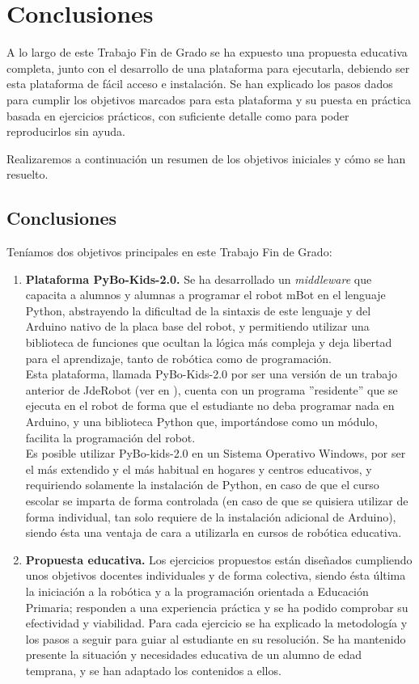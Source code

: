 \chapter{Conclusiones}\label{cap:conclusiones}
A lo largo de este Trabajo Fin de Grado se ha expuesto una propuesta educativa completa, junto con el desarrollo de una plataforma para ejecutarla, debiendo ser esta plataforma de fácil acceso e instalación. Se han explicado los pasos dados para cumplir los objetivos marcados para esta plataforma y su puesta en práctica basada en ejercicios prácticos, con suficiente detalle como para poder reproducirlos sin ayuda.
\par Realizaremos a continuación un resumen de los objetivos iniciales y cómo se han resuelto.
\section{Conclusiones}
Teníamos dos objetivos principales en este Trabajo Fin de Grado:
\begin{enumerate}
	\item \textbf{Plataforma PyBo-Kids-2.0.} Se ha desarrollado un \textit{middleware} que capacita a alumnos y alumnas a programar el robot mBot en el lenguaje Python, abstrayendo la dificultad de la sintaxis de este lenguaje y del Arduino nativo de la placa base del robot, y permitiendo utilizar una biblioteca de funciones que ocultan la lógica más compleja y deja libertad para el aprendizaje, tanto de robótica como de programación. \\
	Esta plataforma, llamada PyBo-Kids-2.0 por ser una versión de un trabajo anterior de JdeRobot (ver en \cite{JdeRobot}), cuenta con un programa ''residente'' que se ejecuta en el robot de forma que el estudiante no deba programar nada en Arduino, y una biblioteca Python que, importándose como un módulo, facilita la programación del robot.\\
	Es posible utilizar PyBo-kids-2.0 en un Sistema Operativo Windows, por ser el más extendido y el más habitual en hogares y centros educativos, y requiriendo solamente la instalación de Python, en caso de que el curso escolar se imparta de forma controlada (en caso de que se quisiera utilizar de forma individual, tan solo requiere de la instalación adicional de Arduino), siendo ésta una ventaja de cara a utilizarla en cursos de robótica educativa. 
	
	\item \textbf{Propuesta educativa.} Los ejercicios propuestos están diseñados cumpliendo unos objetivos docentes individuales y de forma colectiva, siendo ésta última la iniciación a la robótica y a la programación orientada a Educación Primaria; responden a una experiencia práctica y se ha podido comprobar su efectividad y viabilidad. Para cada ejercicio se ha explicado la metodología y los pasos a seguir para guiar al estudiante en su resolución. Se ha mantenido presente la situación y necesidades educativa de un alumno de edad temprana, y se han adaptado los contenidos a ellos.  
\end{enumerate}
